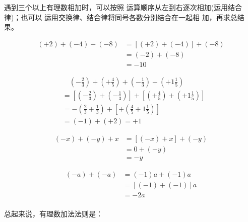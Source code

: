 \begin{analyze}
    遇到三个以上有理数相加时，可以按照
运算顺序从左到右逐次相加(运用结合律)；也可以
运用交换律、结合律将同号各数分别结合在一起相
加，再求总结果。
\end{analyze}


\begin{solution}
\begin{align*}
    (+2)+(-4)+(-8)&= [(+2)+(-4)]+(-8) \tag{结合律}\\
    &=(-2)+(-8) \tag{异号相加法则}\\
    &=-10 \tag{同号相加法则}
\end{align*}

\begin{align*}
  &\quad   \left(-\frac{2}{3}\right)+\left(+\frac{4}{5}\right)+\left(-\frac{1}{3}\right)+\left(+1\frac{1}{5}\right)\\
&=\left[\left(-\frac{2}{3}\right)+\left(-\frac{1}{3}\right)\right]+\left[\left(+\frac{4}{5}\right)+\left(+1\frac{1}{5}\right)\right]  \tag{交换、结合律}\\
&=-\left(\frac{2}{3}+\frac{1}{3}\right)+\left[+\left(\frac{4}{5}+1\frac{1}{5}\right)\right]  \tag{同号加法法则}\\
&=(-1)+(+2)=+1  \tag{异号加法法则}
\end{align*}

\begin{align*}
    (-x)+(-y)+x  &= [(-x)+x]+(-y)  \tag{交换、结合律}\\
    &=0+(-y) \tag{相反数的性质}\\
&=-y \tag{零的特性}
\end{align*}

\begin{align*}
    (-a)+(-a) &= (-1)a+(-1)a  \tag{相反数的意义}\\
    &=[(-1)+(-1)]a  \tag{分配律}\\
    &=-2a  \tag{同号加法法则}\\
\end{align*}
\end{solution}

总起来说，有理数加法法则是：

